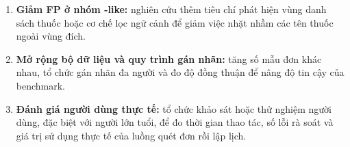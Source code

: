 \documentclass[12pt,a4paper]{report}
\begin{document}
\begin{enumerate}[label=\arabic*.]
    \item \textbf{Giảm FP ở nhóm -like:} nghiên cứu thêm tiêu chí phát hiện vùng danh sách thuốc hoặc cơ chế lọc ngữ cảnh để giảm việc nhặt nhầm các tên thuốc ngoài vùng đích.
    \item \textbf{Mở rộng bộ dữ liệu và quy trình gán nhãn:} tăng số mẫu đơn khác nhau, tổ chức gán nhãn đa người và đo độ đồng thuận để nâng độ tin cậy của benchmark.
    \item \textbf{Đánh giá người dùng thực tế:} tổ chức khảo sát hoặc thử nghiệm người dùng, đặc biệt với người lớn tuổi, để đo thời gian thao tác, số lỗi rà soát và giá trị sử dụng thực tế của luồng quét đơn rồi lập lịch.
\end{enumerate}

\clearpage
\end{document}
